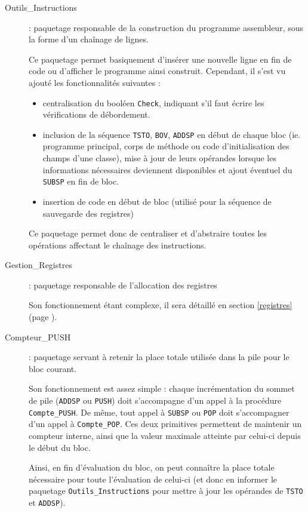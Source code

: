 \begin{description}
\item[Outils\_Instructions] : paquetage responsable de la construction du programme assembleur, sous la forme d'un chaînage de lignes.

  Ce paquetage permet basiquement d'insérer une nouvelle ligne en fin de code ou d'afficher le programme ainsi construit. Cependant, il s'est vu ajouté les fonctionnalités suivantes :

  \begin{itemize}
  \item centralisation du booléen \verb!Check!, indiquant s'il faut écrire les vérifications de débordement.
  \item inclusion de la séquence \verb!TSTO!, \verb!BOV!, \verb!ADDSP! en début de chaque bloc (ie. programme principal, corps de méthode ou code d'initialisation des champs d'une classe), mise à jour de leurs opérandes lorsque les informations nécessaires deviennent disponibles et ajout éventuel du \verb!SUBSP! en fin de bloc.
  \item insertion de code en début de bloc (utilisé pour la séquence de sauvegarde des registres)
  \end{itemize}

  Ce paquetage permet donc de centraliser et d'abstraire toutes les opérations affectant le chaînage des instructions.

\item[Gestion\_Registres] : paquetage responsable de l'allocation des registres
  
  Son fonctionnement étant complexe, il sera détaillé en section \ref{registres} (page \pageref{registres}).
  
\item[Compteur\_PUSH] : paquetage servant à retenir la place totale utilisée dans la pile pour le bloc courant.
  
  Son fonctionnement est assez simple : chaque incrémentation du sommet de pile (\verb!ADDSP! ou \verb!PUSH!) doit s'accompagne d'un appel à la procédure \verb!Compte_PUSH!. De même, tout appel à \verb!SUBSP! ou \verb!POP! doit s'accompagner d'un appel à \verb!Compte_POP!. Ces deux primitives permettent de maintenir un compteur interne, ainsi que la valeur maximale atteinte par celui-ci depuis le début du bloc.

        Ainsi, en fin d'évaluation du bloc, on peut connaître la place totale nécessaire pour toute l'évaluation de celui-ci (et donc en informer le paquetage \verb!Outils_Instructions! pour mettre à jour les opérandes de \verb!TSTO! et \verb!ADDSP!).
        

\end{description}
